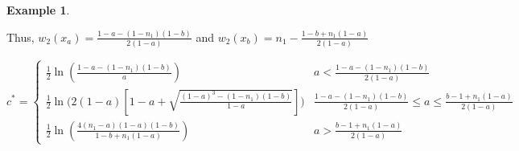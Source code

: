 \documentclass[11pt]{article}
\theoremstyle{definition}
\newtheorem{ex}[thm]{Example}
\numberwithin{equation}{section}
\numberwithin{thm}{section}
\renewcommand{\a}{a}
\renewcommand{\b}{b}
\newcommand{\m}{n_1}
\begin{document}
\begin{ex}
\begin{enumerate}[{Case} 1.]
Thus, $w_2(x_\a)=\frac{1-\a-(1-\m)(1-\b)}{2(1-\a)}$ and $w_2(x_\b)=\m - \frac{1-\b+\m(1-\a)}{2(1-\a)}$

\begin{equation}
c^* = \begin{cases}
\frac{1}{2} \ln \left( \frac{1-\a-(1-\m)(1-\b)}{\a} \right) & \a<\frac{1-\a-(1-\m)(1-\b)}{2(1-\a)} \\
\frac{1}{2} \ln \Big( 2(1-\a)\left[1-\a + \sqrt{\frac{(1-\a)^3-(1-\m)(1-\b) }{1-\a}}\right] \Big) & \frac{1-\a-(1-\m)(1-\b)}{2(1-\a)}\leq\a\leq\frac{\b-1+\m(1-\a)}{2(1-\a)} \\
\frac{1}{2} \ln \left( \frac{4(\m-\a)(1-\a)(1-\b)}{1-\b+\m(1-\a)}\right) & \a>\frac{\b-1+\m(1-\a)}{2(1-\a)}
\end{cases}
\end{equation}

\end{enumerate}


\end{ex}
\end{document}

